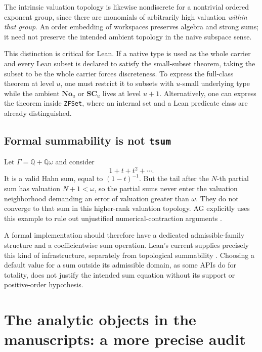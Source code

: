 \documentclass[11pt,letterpaper]{article}
\theoremstyle{definition}
\theoremstyle{remark}
\newcommand{\No}{\mathbf{No}}
\newcommand{\SC}{\mathbf{SC}}
\newcommand{\Q}{\mathbb Q}
\numberwithin{equation}{section}
\begin{document}
The intrinsic valuation topology is likewise nondiscrete for a nontrivial ordered exponent group, since there are monomials of arbitrarily high valuation \emph{within that group}. An order embedding of workspaces preserves algebra and strong sums; it need not preserve the intended ambient topology in the naive subspace sense.

This distinction is critical for Lean. If a native type is used as the whole carrier and every Lean subset is declared to satisfy the small-subset theorem, taking the subset to be the whole carrier forces discreteness. To express the full-class theorem at level \(u\), one must restrict it to subsets with \(u\)-small underlying type while the ambient \(\No_u\) or \(\SC_u\) lives at level \(u+1\). Alternatively, one can express the theorem inside \texttt{ZFSet}, where an internal set and a Lean predicate class are already distinguished.

\subsection{Formal summability is not \texttt{tsum}}
Let \(\Gamma=\Q+\Q\omega\) and consider
\[
 1+t+t^2+\cdots.
\]
It is a valid Hahn sum, equal to \((1-t)^{-1}\). But the tail after the \(N\)-th partial sum has valuation \(N+1<\omega\), so the partial sums never enter the valuation neighborhood demanding an error of valuation greater than \(\omega\). They do not converge to that sum in this higher-rank valuation topology. AG explicitly uses this example to rule out unjustified numerical-contraction arguments \cite[\S2]{AG}.

A formal implementation should therefore have a dedicated admissible-family structure and a coefficientwise sum operation. Lean's current  supplies precisely this kind of infrastructure, separately from topological summability \cite{MathlibSummable}. Choosing a default value for a sum outside its admissible domain, as some APIs do for totality, does not justify the intended sum equation without its support or positive-order hypothesis.

\section{The analytic objects in the manuscripts: a more precise audit}\label{sec:analysis-audit}
\end{document}
